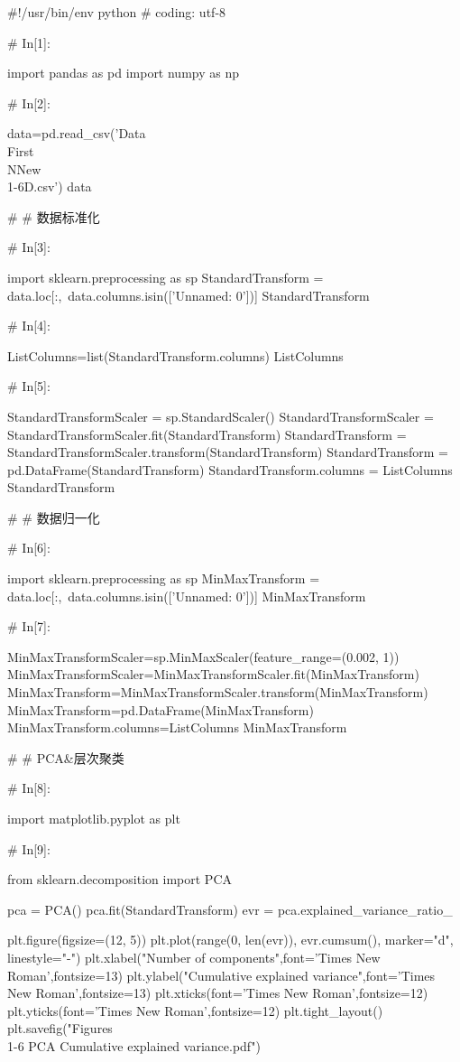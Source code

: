 \documentclass{MathorCupModeling}
\begin{document}
\begin{python}
#!/usr/bin/env python
# coding: utf-8

# In[1]:


import pandas as pd
import numpy as np


# In[2]:


data=pd.read_csv('Data\\First\\NNew\\1-6D.csv')
data


# # 数据标准化

# In[3]:


import sklearn.preprocessing as sp
StandardTransform = data.loc[:,~data.columns.isin(['Unnamed: 0'])]
StandardTransform


# In[4]:


ListColumns=list(StandardTransform.columns)
ListColumns


# In[5]:


StandardTransformScaler = sp.StandardScaler()
StandardTransformScaler = StandardTransformScaler.fit(StandardTransform)
StandardTransform = StandardTransformScaler.transform(StandardTransform)
StandardTransform = pd.DataFrame(StandardTransform)
StandardTransform.columns = ListColumns
StandardTransform


# # 数据归一化

# In[6]:


import sklearn.preprocessing as sp
MinMaxTransform = data.loc[:,~data.columns.isin(['Unnamed: 0'])]
MinMaxTransform


# In[7]:


MinMaxTransformScaler=sp.MinMaxScaler(feature_range=(0.002, 1))
MinMaxTransformScaler=MinMaxTransformScaler.fit(MinMaxTransform)
MinMaxTransform=MinMaxTransformScaler.transform(MinMaxTransform)
MinMaxTransform=pd.DataFrame(MinMaxTransform)
MinMaxTransform.columns=ListColumns
MinMaxTransform


# # PCA&层次聚类

# In[8]:


import matplotlib.pyplot as plt


# In[9]:


from sklearn.decomposition import PCA

pca = PCA()
pca.fit(StandardTransform)
evr = pca.explained_variance_ratio_

plt.figure(figsize=(12, 5))
plt.plot(range(0, len(evr)), evr.cumsum(), marker="d", linestyle="-")
plt.xlabel("Number of components",font='Times New Roman',fontsize=13)
plt.ylabel("Cumulative explained variance",font='Times New Roman',fontsize=13)
plt.xticks(font='Times New Roman',fontsize=12)
plt.yticks(font='Times New Roman',fontsize=12)
plt.tight_layout()
plt.savefig("Figures\\1-6 PCA Cumulative explained variance.pdf")



\end{python}
\end{document}
